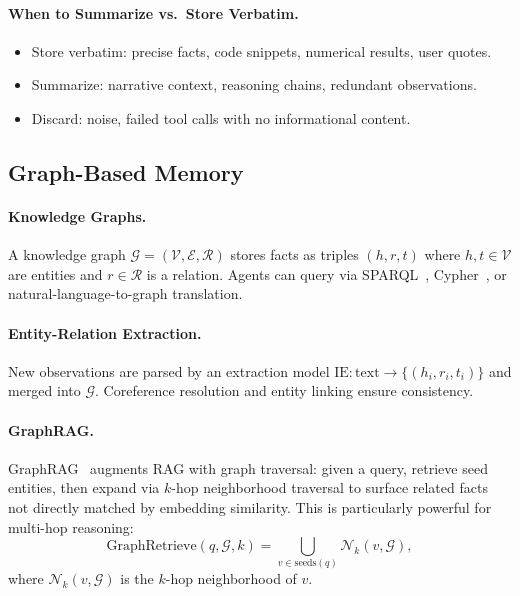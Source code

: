 \paragraph{When to Summarize vs.~Store Verbatim.}
\label{when-to-summarize-vs.-store-verbatim.}

\begin{itemize}
  \item Store verbatim: precise facts, code snippets, numerical results, user quotes.
  \item Summarize: narrative context, reasoning chains, redundant observations.
  \item Discard: noise, failed tool calls with no informational content.
\end{itemize}

\subsection{Graph-Based Memory}
\label{graph-based-memory}

\paragraph{Knowledge Graphs.}
\label{knowledge-graphs.}

A knowledge graph $\mathcal{G} = (\mathcal{V}, \mathcal{E}, \mathcal{R})$ stores facts as triples $(h, r, t)$ where $h, t \in \mathcal{V}$ are entities and $r \in \mathcal{R}$ is a relation. Agents can query via SPARQL~\cite{harris2013sparql}, Cypher~\cite{francis2018cypher}, or natural-language-to-graph translation.

\paragraph{Entity-Relation Extraction.}
\label{entity-relation-extraction.}

New observations are parsed by an extraction model $\text{IE}: \text{text} \to \{(h_i, r_i, t_i)\}$ and merged into $\mathcal{G}$. Coreference resolution and entity linking ensure consistency.

\paragraph{GraphRAG.}
\label{graphrag.}

GraphRAG~\cite{edge2024local} augments RAG with graph traversal: given a query, retrieve seed entities, then expand via $k$-hop neighborhood traversal to surface related facts not directly matched by embedding similarity. This is particularly powerful for multi-hop reasoning: 
\[
\text{GraphRetrieve}(q, \mathcal{G}, k) = \bigcup_{v \in \text{seeds}(q)} \mathcal{N}_k(v, \mathcal{G}),
\]
 where $\mathcal{N}_k(v, \mathcal{G})$ is the $k$-hop neighborhood of $v$.

